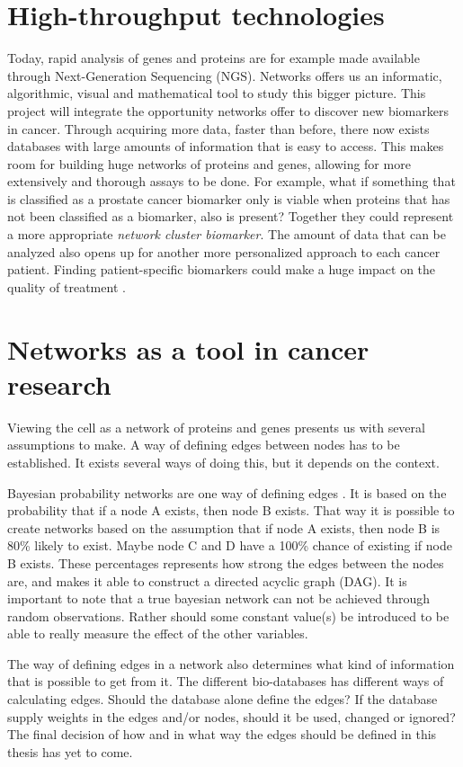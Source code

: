 \section{High-throughput technologies}
Today, rapid analysis of genes and proteins are for example made available
through Next-Generation Sequencing (NGS)\cite{ngs1}. Networks offers us an
informatic, algorithmic, visual and mathematical tool to study this bigger
picture. This project will integrate the opportunity networks offer to discover
new biomarkers in cancer. Through acquiring more data, faster than before, there
now exists databases with large amounts of information that is easy to access.
This makes room for building huge networks of proteins and genes, allowing for
more extensively and thorough assays to be done. For example, what if something
that is classified as a prostate cancer biomarker only is viable when proteins
that has not been classified as a biomarker, also is present?  Together they
could represent a more appropriate \emph{network cluster biomarker}. The amount
of data that can be analyzed also opens up for another more personalized
approach to each cancer patient. Finding patient-specific biomarkers could make
a huge impact on the quality of treatment \cite{personalized,personalized2}.  

\section{Networks as a tool in cancer research}
Viewing the cell as a network of proteins and genes presents us with several
assumptions to make. A way of defining edges between nodes has to be
established. It exists several ways of doing this, but it depends on the
context.

Bayesian probability networks are one way of defining edges
\cite{bayesiannetworks}. It is based on the probability that if a node A exists,
then node B exists. That way it is possible to create networks based on the
assumption that if node A exists, then node B is 80\% likely to exist. Maybe
node C and D have a 100\% chance of existing if node B exists.  These
percentages represents how strong the edges between the nodes are, and makes it
able to construct a directed acyclic graph (DAG). It is important to note that a
true bayesian network can not be achieved through random observations. Rather
should some constant value(s) be introduced to be able to really measure the
effect of the other variables.

The way of defining edges in a network also determines what kind of information
that is possible to get from it. The different bio-databases has different ways
of calculating edges. Should the database alone define the edges? If the
database supply weights in the edges and/or nodes, should it be used, changed or
ignored? The final decision of how and in what way the edges should be defined
in this thesis has yet to come. 

